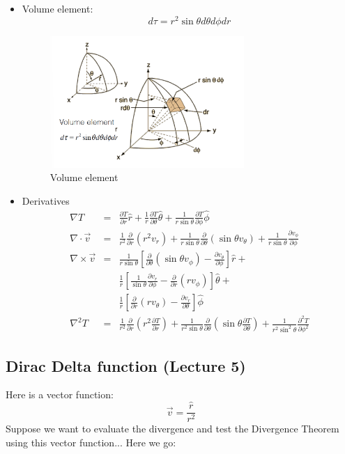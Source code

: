 \documentclass[12pt,a4paper,twoside]{article}
\numberwithin{equation}{section}
\begin{document}
\begin{itemize}
		\item Volume element:
		\[d\tau =r^2\sin\theta d\theta d\phi dr\]
		\begin{figure}[h]
			\centering
			\includegraphics[height=5cm]{250-Revision/spherical-dtau.png}
			\caption{Volume element}
			\label{fig:spherical-dtau}
		\end{figure}
		
		\item Derivatives
		\begin{eqnarray*}
			\nabla T &=& \frac{\partial T}{\partial r}\hat{r} + \frac{1}{r}\frac{\partial T}{\partial \theta}\hat{\theta} + \frac{1}{r\sin\theta}\frac{\partial T}{\partial \phi}\hat{\phi}\\
			\nabla \cdot \overrightarrow{v} &=& \frac{1}{r^2}\frac{\partial}{\partial r}(r^2v_r) +\frac{1}{r\sin\theta}\frac{\partial}{\partial\theta}(\sin\theta v_\theta)+\frac{1}{r\sin\theta}\frac{\partial v_\phi}{\partial \phi}\\
			\nabla \times \overrightarrow{v} &=& \frac{1}{r\sin\theta}\left[\frac{\partial}{\partial \theta}(\sin\theta v_\phi)-\frac{\partial v_\theta}{\partial \phi}\right]\hat{r}+\\
			& & \frac{1}{r}\left[\frac{1}{\sin\theta}\frac{\partial v_r}{\partial \phi}-\frac{\partial}{\partial r}(rv_\phi)\right]\hat{\theta}+\\
			& & \frac{1}{r}\left[\frac{\partial}{\partial r}(rv_\theta)-\frac{\partial v_r}{\partial\theta}\right]\hat{\phi}\\
			\nabla^2T &=& \frac{1}{r^2}\frac{\partial}{\partial r}\left(r^2\frac{\partial T}{\partial r}\right) + \frac{1}{r^2\sin\theta}\frac{\partial}{\partial \theta}\left(\sin\theta\frac{\partial T}{\partial \theta}\right) +\frac{1}{r^2\sin^2\theta}\frac{\partial^2T}{\partial\phi^2} 
		\end{eqnarray*}
		
	\end{itemize}
	
	
	
	\subsection{Dirac Delta function (Lecture 5)}
	Here is a vector function:
	\[\overrightarrow{v} =\frac{\hat{r}}{r^2}\]
	Suppose we want to evaluate the divergence and test the Divergence Theorem using this vector function... Here we go:\\
	
\end{document}
